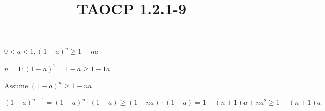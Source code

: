 \documentclass{article}
\title{TAOCP 1.2.1\mbox{-}9}
\begin{document}
\maketitle

\( 0 < a < 1, {(1-a)}^{n}\geq 1-na \)

\( n = 1: {(1-a)}^{1}=1-a\geq 1 - 1a \)

Assume \( {(1-a)}^{n} \geq 1 - na \)

\( {(1-a)}^{n+1}={(1-a)}^{n}\cdot(1-a)\geq(1-na)\cdot(1-a)=1-(n+1)a+na^{2}\geq1-(n+1)a \)
\end{document}
